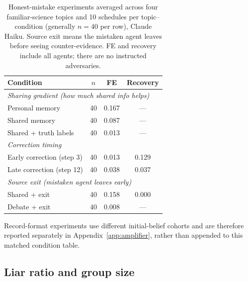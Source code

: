 \begin{table}[htbp]
\caption{Honest-mistake experiments averaged across four familiar-science topics and 10 schedules per topic--condition (generally $n=40$ per row), Claude Haiku. Source exit means the mistaken agent leaves before seeing counter-evidence. FE and recovery include all agents; there are no instructed adversaries.}
\label{tab:app_honest}
\begin{center}
\small
\begin{tabular}{lccc}
\toprule
Condition & $n$ & FE & Recovery \\
\midrule
\multicolumn{4}{l}{\emph{Sharing gradient (how much shared info helps)}} \\
Personal memory & 40 & 0.167 & --- \\
Shared memory & 40 & 0.087 & --- \\
Shared + truth labels & 40 & 0.013 & --- \\
\midrule
\multicolumn{4}{l}{\emph{Correction timing}} \\
Early correction (step 3) & 40 & 0.013 & 0.129 \\
Late correction (step 12) & 40 & 0.038 & 0.037 \\
\midrule
\multicolumn{4}{l}{\emph{Source exit (mistaken agent leaves early)}} \\
Shared + exit & 40 & 0.158 & 0.000 \\
Debate + exit & 40 & 0.008 & --- \\
\bottomrule
\end{tabular}
\end{center}
\end{table}

Record-format experiments use different initial-belief cohorts and are therefore reported separately in Appendix~\ref{app:amplifier}, rather than appended to this matched condition table.

\subsection{Liar ratio and group size}
\label{app:ratio}

